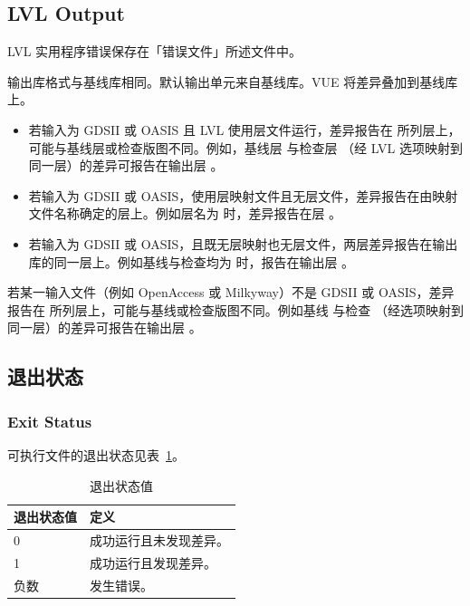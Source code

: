 \subsection*{LVL Output}

LVL 实用程序错误保存在「错误文件」所述文件中。

输出库格式与基线库相同。默认输出单元来自基线库。VUE 将差异叠加到基线库上。
\begin{itemize}
  \item 若输入为 GDSII 或 OASIS 且 LVL 使用层文件运行，差异报告在  所列层上，可能与基线层或检查版图不同。例如，基线层  与检查层 （经 LVL 选项映射到同一层）的差异可报告在输出层 。
  \item 若输入为 GDSII 或 OASIS，使用层映射文件且无层文件，差异报告在由映射文件名称确定的层上。例如层名为  时，差异报告在层 。
  \item 若输入为 GDSII 或 OASIS，且既无层映射也无层文件，两层差异报告在输出库的同一层上。例如基线与检查均为  时，报告在输出层 。
\end{itemize}

若某一输入文件（例如 OpenAccess 或 Milkyway）不是 GDSII 或 OASIS，差异报告在  所列层上，可能与基线或检查版图不同。例如基线  与检查 （经选项映射到同一层）的差异可报告在输出层 。

\subsection{退出状态}
\subsubsection*{Exit Status}

 可执行文件的退出状态见表~\ref{tab:app-b-exit}。

\begin{table}[htbp]
\centering
\caption{退出状态值}
\label{tab:app-b-exit}
\begin{tabular}{@{}lp{}@{}}
\toprule
退出状态值 & 定义 \\
\midrule
0 & 成功运行且未发现差异。 \\
1 & 成功运行且发现差异。 \\
负数 & 发生错误。 \\
\bottomrule
\end{tabular}
\end{table}

